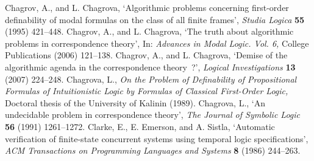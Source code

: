 \documentclass[draft]{article}
\def\SQEMA{\mathtt{SQEMA}}
\begin{document}
\begin{thebibliography}{}
%
%
{\sc Chagrov,} A., and L. {\sc Chagrova,}
`Algorithmic problems concerning first-order definability of modal formulas on the class of all finite frames',
\emph{Studia Logica}\/ {\bf 55} (1995) 421--448.
%
%
{\sc Chagrov,} A., and L. {\sc Chagrova,}
`The truth about algorithmic problems in correspondence theory',
In: \emph{Advances in Modal Logic. Vol. 6,}\/
College Publications (2006) 121--138.
%
%
{\sc Chagrov,} A., and L. {\sc Chagrova,}
`Demise of the algorithmic agenda in the correspondence theory~?',
\emph{Logical Investigations}\/ {\bf 13} (2007) 224--248.
%
%
%
%
{\sc Chagrova,} L.,
\emph{On the Problem of Definability of Propositional Formulas of Intuitionistic Logic by Formulas of Classical First-Order Logic,}\/
Doctoral thesis of the University of Kalinin (1989).
%
%
{\sc Chagrova,} L.,
`An undecidable problem in correspondence theory',
\emph{The Journal of Symbolic Logic}\/ {\bf 56} (1991) 1261--1272.
%
%
%
%
%
%
%
%
%
%
{\sc Clarke,} E., E. {\sc Emerson,} and A. {\sc Sistla,}
`Automatic verification of finite-state concurrent systems using temporal logic specifications',
\emph{ACM Transactions on Programming Languages and Systems}\/ {\bf 8} (1986) 244--263.
%
%
%
%

\end{thebibliography}
\end{document}
